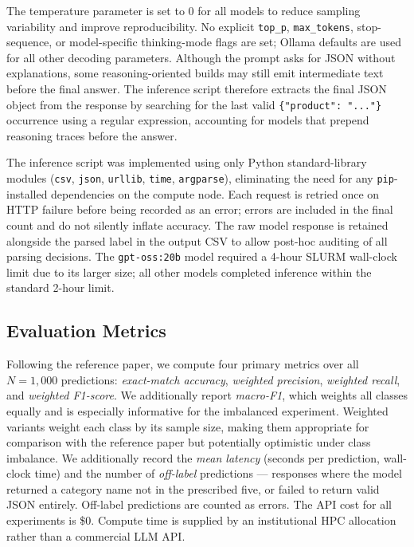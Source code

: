 \documentclass[journal]{IEEEtran}
\begin{document}
The temperature parameter is set to 0 for all models to reduce
sampling variability and improve reproducibility. No explicit
\texttt{top\_p}, \texttt{max\_tokens}, stop-sequence, or model-specific
thinking-mode flags are set; Ollama defaults are used for all other
decoding parameters. Although the prompt asks for JSON without
explanations, some reasoning-oriented builds may still emit
intermediate text before the final answer. The inference script
therefore extracts the final JSON object from the response by searching
for the last valid \texttt{\{"product": "..."\}} occurrence using a
regular expression, accounting for models that prepend reasoning traces
before the answer.

The inference script was implemented using only Python standard-library
modules (\texttt{csv}, \texttt{json}, \texttt{urllib}, \texttt{time},
\texttt{argparse}), eliminating the need for any \texttt{pip}-installed
dependencies on the compute node. Each request is retried once on
HTTP failure before being recorded as an error; errors are included in
the final count and do not silently inflate accuracy. The raw model
response is retained alongside the parsed label in the output CSV to
allow post-hoc auditing of all parsing decisions. The
\texttt{gpt-oss:20b} model required a 4-hour SLURM wall-clock limit
due to its larger size; all other models completed inference within
the standard 2-hour limit.

\subsection{Evaluation Metrics}

Following the reference paper, we compute four primary metrics over
all $N{=}1{,}000$ predictions: \emph{exact-match accuracy},
\emph{weighted precision}, \emph{weighted recall}, and
\emph{weighted F1-score}. We additionally report \emph{macro-F1},
which weights all classes equally and is especially informative for
the imbalanced experiment. Weighted variants weight each class by its
sample size, making them appropriate for comparison with the reference
paper but potentially optimistic under class imbalance. We additionally
record the \emph{mean
latency} (seconds per prediction, wall-clock time) and the number
of \emph{off-label} predictions — responses where the model returned
a category name not in the prescribed five, or failed to return
valid JSON entirely. Off-label predictions are counted as errors.
The API cost for all experiments is \$0. Compute time is supplied by
an institutional HPC allocation rather than a commercial LLM API.
\end{document}
